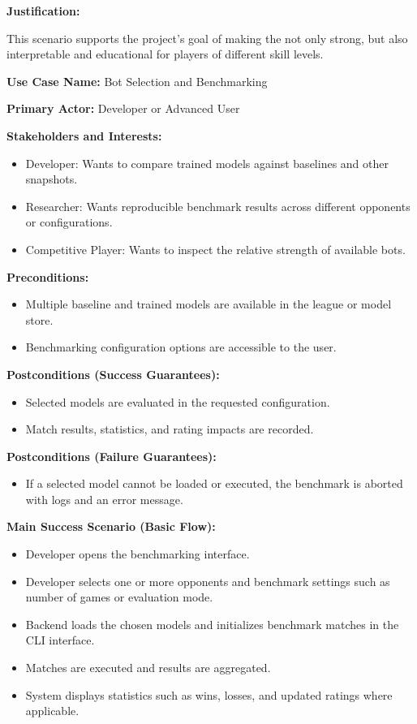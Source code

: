 \documentclass{article}
\begin{document}
\noindent\textbf{Justification:}

This scenario supports the project's goal of making the \AI{} not only strong, but also interpretable and educational for players of different skill levels.

\vspace{1em}

\noindent\textbf{Use Case Name:} Bot Selection and Benchmarking

\noindent\textbf{Primary Actor:} Developer or Advanced User

\noindent\textbf{Stakeholders and Interests:}
\begin{itemize}
    \item Developer: Wants to compare trained models against baselines and other snapshots.
    \item Researcher: Wants reproducible benchmark results across different opponents or configurations.
    \item Competitive Player: Wants to inspect the relative strength of available bots.
\end{itemize}

\noindent\textbf{Preconditions:}
\begin{itemize}
    \item Multiple baseline and trained models are available in the league or model store.
    \item Benchmarking configuration options are accessible to the user.
\end{itemize}

\noindent\textbf{Postconditions (Success Guarantees):}
\begin{itemize}
    \item Selected models are evaluated in the requested configuration.
    \item Match results, statistics, and rating impacts are recorded.
\end{itemize}

\noindent\textbf{Postconditions (Failure Guarantees):}
\begin{itemize}
    \item If a selected model cannot be loaded or executed, the benchmark is aborted with logs and an error message.
\end{itemize}

\noindent\textbf{Main Success Scenario (Basic Flow):}
\begin{itemize}
    \item Developer opens the benchmarking interface.
    \item Developer selects one or more opponents and benchmark settings such as number of games or evaluation mode.
    \item Backend loads the chosen models and initializes benchmark matches in the CLI interface.
    \item Matches are executed and results are aggregated.
    \item System displays statistics such as wins, losses, and updated ratings where applicable.
\end{itemize}
\end{document}
